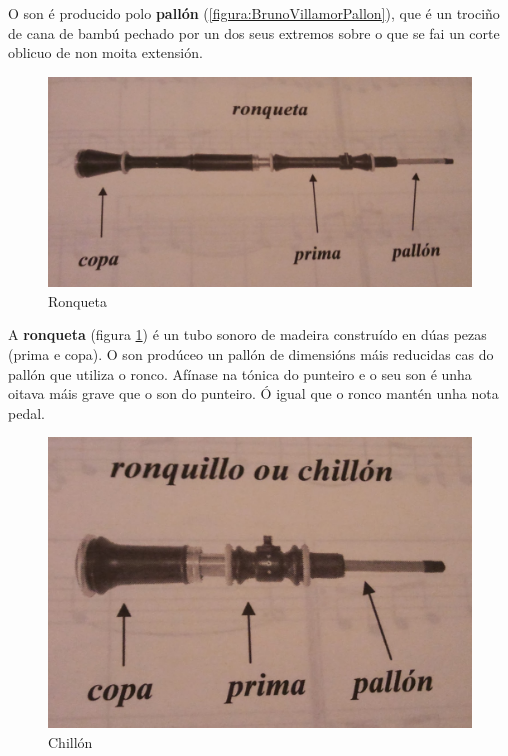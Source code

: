  O son é producido polo \textbf{pallón} (\ref{figura:BrunoVillamorPallon}), que
 é un trociño de cana de bambú pechado por un dos seus extremos sobre o que se
 fai un corte oblicuo de non moita extensión. \\

 \begin{figure}[htbp]
  \centering
  \includegraphics[scale=0.1,keepaspectratio=true]{./imagenes/bruno-villamor-ronqueta.jpg}
  \caption[Ronqueta]{Ronqueta \cite{BrunoVillamorCaderno15}}
  \label{figura:BrunoVillamorRonqueta}
 \end{figure}

 A \textbf{ronqueta} (figura \ref{figura:BrunoVillamorRonqueta}) é un tubo
 sonoro de madeira construído en dúas pezas (prima e copa). O son prodúceo un
 pallón de dimensións máis reducidas cas do pallón que utiliza o ronco. Afínase
 na tónica do punteiro e o seu son é unha oitava máis grave que o son do
 punteiro. Ó igual que o ronco mantén unha nota pedal. \\

 \begin{figure}[htbp]
  \centering
  \includegraphics[scale=0.1,keepaspectratio=true]{./imagenes/bruno-villamor-chillon.jpg}
  \caption[Chillón]{Chillón \cite{BrunoVillamorCaderno15}}
  \label{figura:BrunoVillamorChillon}
 \end{figure}

